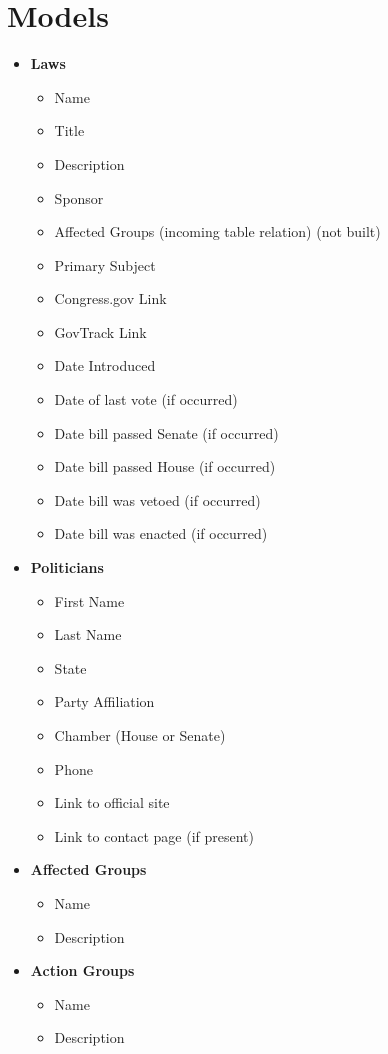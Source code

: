 \documentclass[12pt]{article}
\begin{document}
\section{Models}
\begin{itemize}[label=]
	\item\textbf{Laws}
	\begin{itemize}
		\item Name
		\item Title
		\item Description
		\item Sponsor
		\item Affected Groups (incoming table relation) (not built)
		\item Primary Subject
		\item Congress.gov Link
		\item GovTrack Link
		\item Date Introduced
		\item Date of last vote  (if occurred)
		\item Date bill passed Senate (if occurred)
		\item Date bill passed House (if occurred)
		\item Date bill was vetoed (if occurred)
		\item Date bill was enacted  (if occurred)
	\end{itemize}
	\item\textbf{Politicians}
	\begin{itemize}
		\item First Name
		\item Last Name
		\item State
		\item Party Affiliation
		\item Chamber (House or Senate)
		\item Phone
		\item Link to official site
		\item Link to contact page (if present)
	\end{itemize}
	\item\textbf{Affected Groups}
	\begin{itemize}
		\item Name
		\item Description
	\end{itemize}
	\item\textbf{Action Groups}
	\begin{itemize}
		\item Name
		\item Description

\end{itemize}
\end{itemize}
\end{document}
